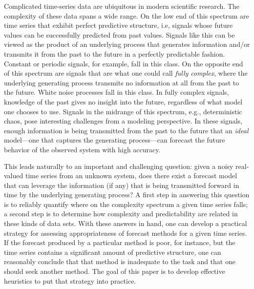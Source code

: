 \documentclass[%
pre,
reprint,
superscriptaddress,
showpacs,
nofootinbib,
nobibnotes,
 amsmath,amssymb,
 aps,
]{revtex4-1}
\begin{document}
%
Complicated time-series data are ubiquitous in modern scientific
research.  The complexity of these data spans a wide range.  On the
low end of this spectrum are time series that exhibit perfect
predictive structure, i.e, signals whose future values can be
successfully predicted from past values.  Signals like this can be
viewed as the product of an underlying process that generates
information and/or transmits it from the past to the future in a
perfectly predictable fashion.  Constant or periodic signals, for
example, fall in this class.  On the opposite end of this spectrum are
signals that are what one could call \emph{fully complex}, where the
underlying generating process transmits no information at all from the
past to the future.  White noise processes fall in this class.  In
fully complex signals, knowledge of the past gives no insight into the
future, regardless of what model one chooses to use. Signals in the
midrange of this spectrum, e.g., deterministic chaos, pose interesting
challenges from a modeling perspective.  In these signals, enough
information is being transmitted from the past to the future that an
\emph{ideal} model---one that captures the generating process---can
forecast the future behavior of the observed system with high
accuracy.


This leads naturally to an important and challenging question: given a
noisy real-valued time series from an unknown system, does there exist
a forecast model that can leverage the information (if any) that is
being transmitted forward in time by the underlying generating
process?  A first step in answering this question is to reliably
quantify where on the complexity spectrum a given time series falls; a
second step is to determine how complexity and predictability are
related in these kinds of data sets.  With these answers in hand, one
can develop a practical strategy for assessing appropriateness of
forecast methods for a given time series.  If the forecast produced by
a particular method is poor, for instance, but the time series
contains a significant amount of predictive structure, one can
reasonably conclude that that method is inadequate to the task and
that one should seek another method.  The goal of this paper is to
develop effective heuristics to put that strategy into practice.
\end{document}
